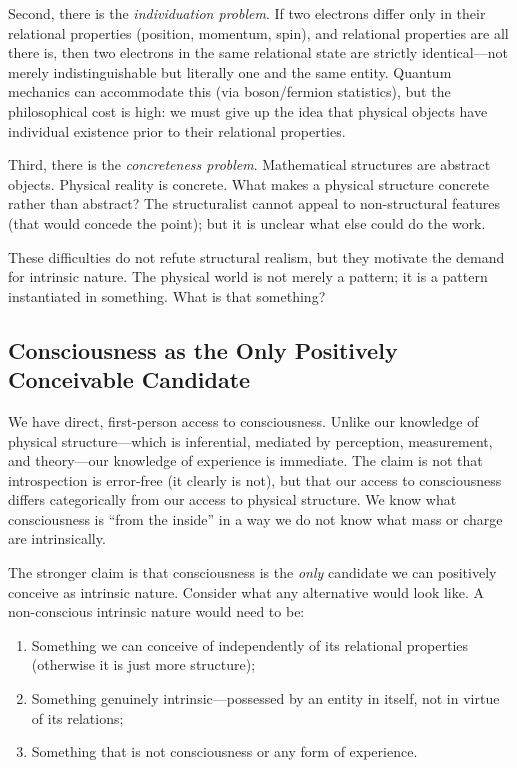 \documentclass[11pt,a4paper]{article}
\theoremstyle{definition}
\theoremstyle{plain}
\theoremstyle{remark}
\begin{document}
Second, there is the \textit{individuation problem}. If two electrons differ only in their relational properties (position, momentum, spin), and relational properties are all there is, then two electrons in the same relational state are strictly identical---not merely indistinguishable but literally one and the same entity. Quantum mechanics can accommodate this (via boson/fermion statistics), but the philosophical cost is high: we must give up the idea that physical objects have individual existence prior to their relational properties.

Third, there is the \textit{concreteness problem}. Mathematical structures are abstract objects. Physical reality is concrete. What makes a physical structure concrete rather than abstract? The structuralist cannot appeal to non-structural features (that would concede the point); but it is unclear what else could do the work.

These difficulties do not refute structural realism, but they motivate the demand for intrinsic nature. The physical world is not merely a pattern; it is a pattern instantiated in something. What is that something?

\subsection{Consciousness as the Only Positively Conceivable Candidate}\label{sec:positive}

We have direct, first-person access to consciousness. Unlike our knowledge of physical structure---which is inferential, mediated by perception, measurement, and theory---our knowledge of experience is immediate. The claim is not that introspection is error-free (it clearly is not), but that our access to consciousness differs categorically from our access to physical structure. We know what consciousness is ``from the inside'' in a way we do not know what mass or charge are intrinsically.

The stronger claim is that consciousness is the \textit{only} candidate we can positively conceive as intrinsic nature. Consider what any alternative would look like. A non-conscious intrinsic nature would need to be:

\begin{enumerate}[label=(\alph*)]
    \item Something we can conceive of independently of its relational properties (otherwise it is just more structure);
    \item Something genuinely intrinsic---possessed by an entity in itself, not in virtue of its relations;
    \item Something that is not consciousness or any form of experience.
\end{enumerate}
\end{document}
